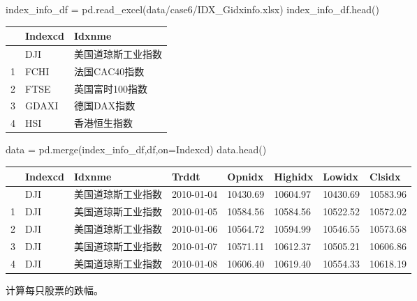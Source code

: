 \documentclass[
  letterpaper,
  DIV=11,
  numbers=noendperiod]{scrreprt}
\newenvironment{Shaded}{\begin{snugshade}}{\end{snugshade}}
\newcommand{\NormalTok}[1]{\textcolor[rgb]{0.00,0.23,0.31}{#1}}
\newcommand{\OperatorTok}[1]{\textcolor[rgb]{0.37,0.37,0.37}{#1}}
\newcommand{\StringTok}[1]{\textcolor[rgb]{0.13,0.47,0.30}{#1}}
\begin{document}
\begin{Shaded}
\begin{Highlighting}[]
\NormalTok{index\_info\_df }\OperatorTok{=}\NormalTok{ pd.read\_excel(}\StringTok{\textquotesingle{}data/case6/IDX\_Gidxinfo.xlsx\textquotesingle{}}\NormalTok{)}
\NormalTok{index\_info\_df.head()}
\end{Highlighting}
\end{Shaded}

\begin{longtable}[]{@{}lll@{}}
\toprule\noalign{}
& Indexcd & Idxnme \\
\midrule\noalign{}
\endhead
\bottomrule\noalign{}
\endlastfoot
0 & DJI & 美国道琼斯工业指数 \\
1 & FCHI & 法国CAC40指数 \\
2 & FTSE & 英国富时100指数 \\
3 & GDAXI & 德国DAX指数 \\
4 & HSI & 香港恒生指数 \\
\end{longtable}

\begin{Shaded}
\begin{Highlighting}[]
\NormalTok{data }\OperatorTok{=}\NormalTok{ pd.merge(index\_info\_df,df,on}\OperatorTok{=}\StringTok{\textquotesingle{}Indexcd\textquotesingle{}}\NormalTok{)}
\NormalTok{data.head()}
\end{Highlighting}
\end{Shaded}

\begin{longtable}[]{@{}llllllll@{}}
\toprule\noalign{}
& Indexcd & Idxnme & Trddt & Opnidx & Highidx & Lowidx & Clsidx \\
\midrule\noalign{}
\endhead
\bottomrule\noalign{}
\endlastfoot
0 & DJI & 美国道琼斯工业指数 & 2010-01-04 & 10430.69 & 10604.97 &
10430.69 & 10583.96 \\
1 & DJI & 美国道琼斯工业指数 & 2010-01-05 & 10584.56 & 10584.56 &
10522.52 & 10572.02 \\
2 & DJI & 美国道琼斯工业指数 & 2010-01-06 & 10564.72 & 10594.99 &
10546.55 & 10573.68 \\
3 & DJI & 美国道琼斯工业指数 & 2010-01-07 & 10571.11 & 10612.37 &
10505.21 & 10606.86 \\
4 & DJI & 美国道琼斯工业指数 & 2010-01-08 & 10606.40 & 10619.40 &
10554.33 & 10618.19 \\
\end{longtable}

计算每只股票的跌幅。
\end{document}
